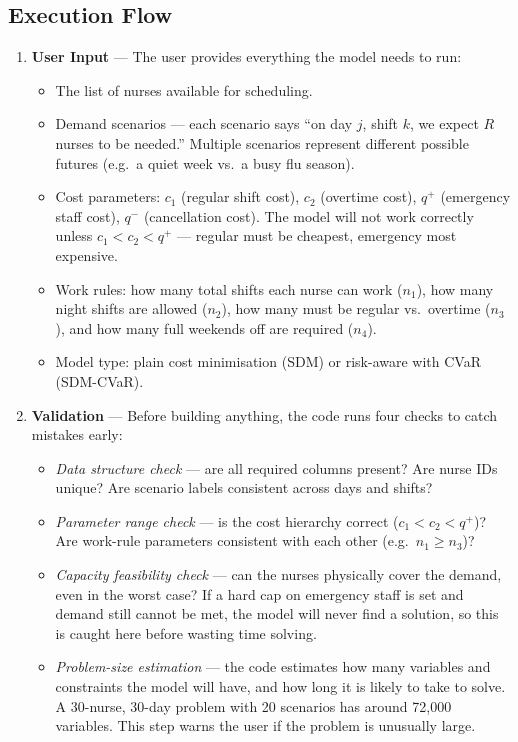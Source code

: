 \documentclass[12pt,a4paper]{article}
\begin{document}
\subsection{Execution Flow}

\begin{enumerate}[leftmargin=20pt, itemsep=8pt,
    label=\colorbox{navyblue}{\color{white}\small\bfseries\arabic*.}]

  \item \textbf{User Input} — The user provides everything the model needs to run:
    \begin{itemize}[itemsep=3pt]
      \item The list of nurses available for scheduling.
      \item Demand scenarios — each scenario says ``on day $j$, shift $k$, we expect $R$ nurses to be needed.'' Multiple scenarios represent different possible futures (e.g.\ a quiet week vs.\ a busy flu season).
      \item Cost parameters: $c_1$ (regular shift cost), $c_2$ (overtime cost), $q^+$ (emergency staff cost), $q^-$ (cancellation cost). The model will not work correctly unless $c_1 < c_2 < q^+$ — regular must be cheapest, emergency most expensive.
      \item Work rules: how many total shifts each nurse can work ($n_1$), how many night shifts are allowed ($n_2$), how many must be regular vs.\ overtime ($n_3$), and how many full weekends off are required ($n_4$).
      \item Model type: plain cost minimisation (SDM) or risk-aware with CVaR (SDM-CVaR).
    \end{itemize}

  \item \textbf{Validation} — Before building anything, the code runs four checks to catch mistakes early:
    \begin{itemize}[itemsep=3pt]
      \item \textit{Data structure check} — are all required columns present? Are nurse IDs unique? Are scenario labels consistent across days and shifts?
      \item \textit{Parameter range check} — is the cost hierarchy correct ($c_1 < c_2 < q^+$)? Are work-rule parameters consistent with each other (e.g.\ $n_1 \geq n_3$)?
      \item \textit{Capacity feasibility check} — can the nurses physically cover the demand, even in the worst case? If a hard cap on emergency staff is set and demand still cannot be met, the model will never find a solution, so this is caught here before wasting time solving.
      \item \textit{Problem-size estimation} — the code estimates how many variables and constraints the model will have, and how long it is likely to take to solve. A 30-nurse, 30-day problem with 20 scenarios has around 72,000 variables. This step warns the user if the problem is unusually large.
    \end{itemize}


\end{enumerate}
\end{document}
